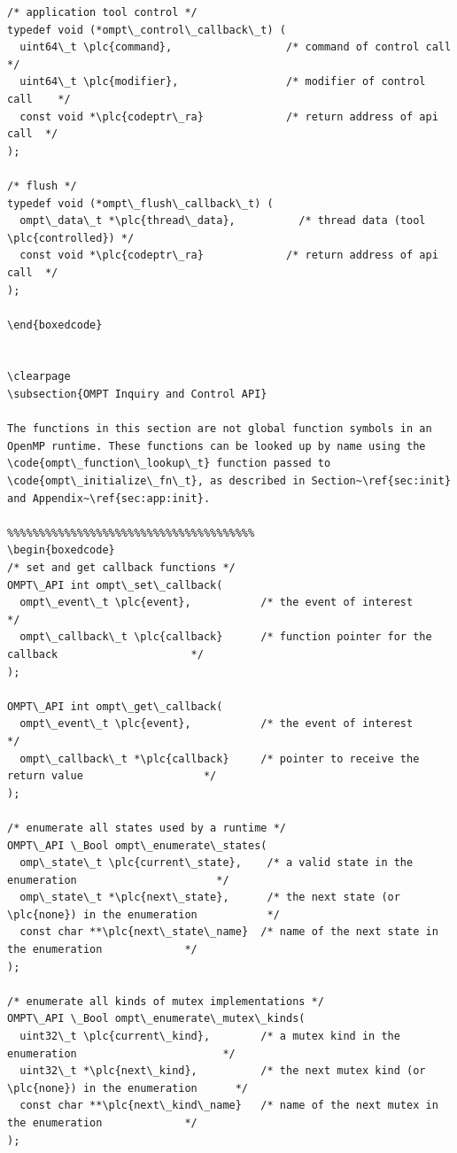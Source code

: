 \documentclass{article}
\begin{document}
\begin{boxedcode}
\begin{verbatim}
/* application tool control */
typedef void (*ompt\_control\_callback\_t) (
  uint64\_t \plc{command},                  /* command of control call     */
  uint64\_t \plc{modifier},                 /* modifier of control call    */
  const void *\plc{codeptr\_ra}             /* return address of api call  */
);

/* flush */
typedef void (*ompt\_flush\_callback\_t) (
  ompt\_data\_t *\plc{thread\_data},          /* thread data (tool \plc{controlled}) */
  const void *\plc{codeptr\_ra}             /* return address of api call  */
);

\end{boxedcode}


\clearpage
\subsection{OMPT Inquiry and Control API}

The functions in this section are not global function symbols in an OpenMP runtime. These functions can be looked up by name using the \code{ompt\_function\_lookup\_t} function passed to \code{ompt\_initialize\_fn\_t}, as described in Section~\ref{sec:init} and Appendix~\ref{sec:app:init}.

%%%%%%%%%%%%%%%%%%%%%%%%%%%%%%%%%%%%%%%
\begin{boxedcode}
/* set and get callback functions */
OMPT\_API int ompt\_set\_callback( 
  ompt\_event\_t \plc{event},           /* the event of interest                                 */
  ompt\_callback\_t \plc{callback}      /* function pointer for the callback                     */
);

OMPT\_API int ompt\_get\_callback(
  ompt\_event\_t \plc{event},           /* the event of interest                                 */
  ompt\_callback\_t *\plc{callback}     /* pointer to receive the return value                   */
);

/* enumerate all states used by a runtime */
OMPT\_API \_Bool ompt\_enumerate\_states(
  omp\_state\_t \plc{current\_state},    /* a valid state in the enumeration                      */
  omp\_state\_t *\plc{next\_state},      /* the next state (or \plc{none}) in the enumeration           */
  const char **\plc{next\_state\_name}  /* name of the next state in the enumeration             */
);

/* enumerate all kinds of mutex implementations */
OMPT\_API \_Bool ompt\_enumerate\_mutex\_kinds(
  uint32\_t \plc{current\_kind},        /* a mutex kind in the enumeration                       */
  uint32\_t *\plc{next\_kind},          /* the next mutex kind (or \plc{none}) in the enumeration      */
  const char **\plc{next\_kind\_name}   /* name of the next mutex in the enumeration             */
);


\end{verbatim}
\end{boxedcode}
\end{document}

